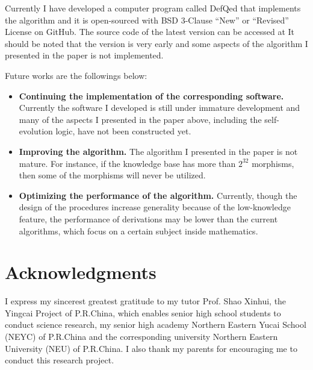 \documentclass{article}
\begin{document}
Currently I have developed a computer program called DefQed that implements the algorithm and it is open-sourced with BSD 3-Clause {``}New{''} or {``}Revised{''} License on GitHub. The source code of the latest version can be accessed at \cite{7} It should be noted that the version is very early and some aspects of the algorithm I presented in the paper is not implemented.

Future works are the followings below:
\begin{itemize}
	\item \textbf{Continuing the implementation of the corresponding software.} Currently the software I developed is still under immature development and many of the aspects I presented in the paper above, including the self-evolution logic, have not been constructed yet.
	\item  \textbf{Improving the algorithm.} The algorithm I presented in the paper is not mature. For instance, if the knowledge base has more than \(2^{32}\) morphisms, then some of the morphisms will never be utilized.
	\item \textbf{Optimizing the performance of the algorithm.} Currently, though the design of the procedures increase generality because of the low-knowledge feature, the performance of derivations may be lower than the current algorithms, which focus on a certain subject inside mathematics.
\end{itemize}

\section*{Acknowledgments}
I express my sincerest greatest gratitude to my tutor Prof. Shao Xinhui, the Yingcai Project of P.R.China, which enables senior high school students to conduct science research, my senior high academy Northern Eastern Yucai School (NEYC) of P.R.China and the corresponding university Northern Eastern University (NEU) of P.R.China. I also thank my parents for encouraging me to conduct this research project.



\end{document}
